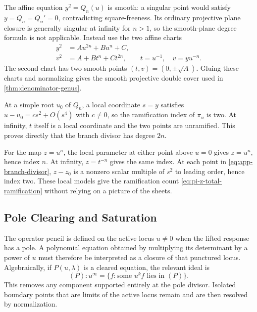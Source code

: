 \documentclass[11pt,reqno]{amsart}
\theoremstyle{remark}
\begin{document}
The affine equation $y^2=Q_n(u)$ is smooth: a singular point would satisfy
$y=Q_n=Q_n'=0$, contradicting square-freeness.  Its ordinary projective
plane closure is generally singular at infinity for $n>1$, so the
smooth-plane degree formula is not applicable.  Instead use the two affine
charts
\begin{align}
 y^2&=Au^{2n}+Bu^n+C,\label{eq:app-finite-chart}\\
 v^2&=A+Bt^n+Ct^{2n},
 \qquad t=u^{-1},\quad v=yu^{-n}.
 \label{eq:app-infinity-chart}
\end{align}
The second chart has two smooth points $(t,v)=(0,\pm\sqrt A)$.  Gluing these
charts and normalizing gives the smooth projective double cover used in
\cref{thm:denominator-genus}.

At a simple root $u_0$ of $Q_n$, a local coordinate $s=y$ satisfies
$u-u_0=c s^2+O(s^4)$ with $c\ne0$, so the ramification index of $\pi_u$ is
two.  At infinity, $t$ itself is a local coordinate and the two points are
unramified.  This proves directly that the branch divisor has degree $2n$.

For the map $z=u^n$, the local parameter at either point above $u=0$ gives
$z=u^n$, hence index $n$.  At infinity, $z=t^{-n}$ gives the same index.  At
each point in \eqref{eq:app-branch-divisor}, $z-z_0$ is a nonzero scalar
multiple of $s^2$ to leading order, hence index two.  These local models give
the ramification count \eqref{eq:pi-z-total-ramification} without relying on
a picture of the sheets.

\subsection{Pole Clearing and Saturation}

The operator pencil is defined on the active locus $u\ne0$ when the lifted
response has a pole.  A polynomial equation obtained by multiplying its
determinant by a power of $u$ must therefore be interpreted as a closure of
that punctured locus.  Algebraically, if $P(u,\lambda)$ is a cleared equation,
the relevant ideal is
\begin{equation}\label{eq:app-saturation}
 (P):u^\infty
 =\{f:\text{some }u^kf\text{ lies in }(P)\}.
\end{equation}
This removes any component supported entirely at the pole divisor.  Isolated
boundary points that are limits of the active locus remain and are then
resolved by normalization.
\end{document}
